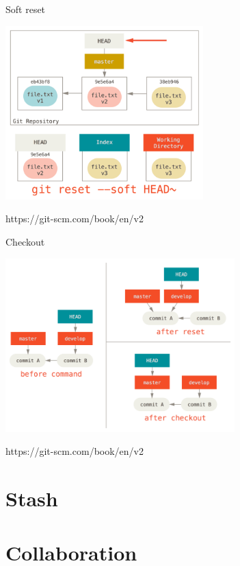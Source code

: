 \documentclass[presentation,aspectratio=169,smaller]{beamer}
\begin{document}
\begin{frame}[label={sec:org23a9a69}]{Soft reset}
\begin{center}
\includegraphics[height=6.7cm]{images/reset-soft.png}
\end{center}

\scriptsize{https://git-scm.com/book/en/v2}
\end{frame}

\begin{frame}[label={sec:orgd03a934}]{Checkout}
\begin{center}
\includegraphics[height=6.7cm]{images/reset-checkout.png}
\end{center}

\scriptsize{https://git-scm.com/book/en/v2}
\end{frame}

\section{Stash}
\label{sec:org426cddd}

\section{Collaboration}
\label{sec:orgd2a0548}
\end{document}
